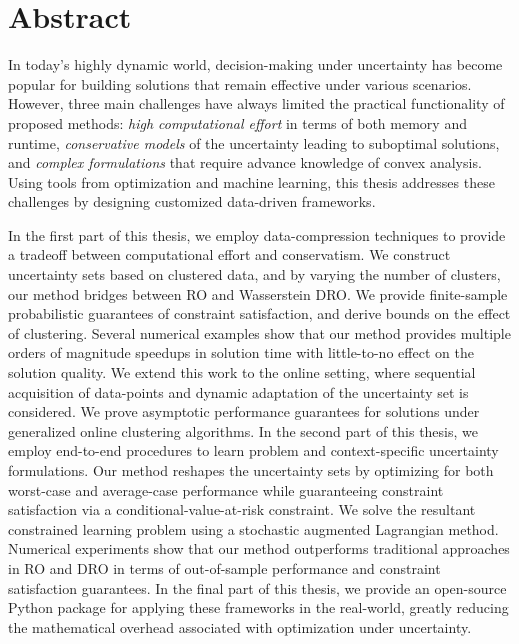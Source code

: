 \documentclass[12pt]{report}
\begin{document}
\chapter*{Abstract}
In today's highly dynamic world, 
decision-making under uncertainty has become popular for building solutions that remain effective under various scenarios. However, three main challenges have always limited the practical functionality of proposed methods: \emph{high computational effort} in terms of both memory and runtime, \emph{conservative models} of the uncertainty leading to suboptimal solutions, and \emph{complex formulations} that require advance knowledge of convex analysis.
Using tools from optimization and machine learning, this thesis addresses these challenges by designing customized data-driven frameworks.


In the first part of this thesis, we employ data-compression techniques to provide a tradeoff between computational effort and conservatism. 
We construct uncertainty sets 
based on clustered data, and by varying the number of clusters, our
method bridges between \gls{RO} and Wasserstein \gls{DRO}. 
We provide finite-sample probabilistic guarantees of constraint satisfaction, and derive bounds on the effect of clustering.
Several numerical examples show that our method provides multiple orders of magnitude speedups in solution time with little-to-no effect on the solution quality. We extend this work to the online setting, where sequential acquisition of data-points and dynamic adaptation of the uncertainty set is considered. We prove asymptotic performance guarantees for solutions under generalized online clustering algorithms.
In the second part of this thesis, we employ end-to-end procedures to learn problem and context-specific uncertainty formulations. Our method reshapes the uncertainty sets by optimizing for both worst-case and average-case performance while guaranteeing constraint satisfaction via a conditional-value-at-risk constraint. We solve the resultant constrained learning problem using a stochastic augmented Lagrangian method.
Numerical experiments show that our method outperforms traditional approaches in \gls{RO} and \gls{DRO} in terms of out-of-sample performance and constraint satisfaction guarantees.
In the final part of this thesis, we provide an open-source Python package for applying these frameworks in the real-world, greatly reducing the mathematical overhead associated with optimization under uncertainty.
\end{document}
